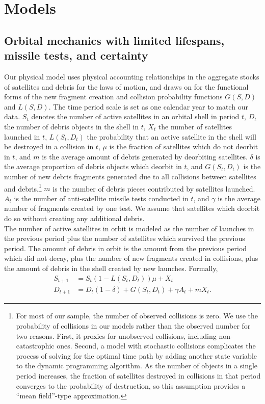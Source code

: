 \documentclass[12pt]{article}
\begin{document}
\section{Models}

\subsection{Orbital mechanics with limited lifespans, missile tests, and certainty}

Our physical model uses physical accounting relationships in the aggregate stocks of satellites and debris for the laws of motion, and draws on \citep{letiziaetal2017} for the functional forms of the new fragment creation and collision probability functions $G(S,D)$ and $L(S,D)$. The time period scale is set as one calendar year to match our data. $S_t$ denotes the number of active satellites in an orbital shell in period $t$, $D_t$ the number of debris objects in the shell in $t$, $X_t$ the number of satellites launched in $t$, $L(S_t,D_t)$ the probability that an active satellite in the shell will be destroyed in a collision in $t$, $\mu$ is the fraction of satellites which do not deorbit in $t$, and $m$ is the average amount of debris generated by deorbiting satellites. $\delta$ is the average proportion of debris objects which deorbit in $t$, and $G(S_t,D_t)$ is the number of new debris fragments generated due to all collisions between satellites and debris.\footnote{For most of our sample, the number of observed collisions is zero. We use the probability of collisions in our models rather than the observed number for two reasons. First, it proxies for unobserved collisions, including non-catastrophic ones. Second, a model with stochastic collisions complicates the process of solving for the optimal time path by adding another state variable to the dynamic programming algorithm. As the number of objects in a single period increases, the fraction of satellites destroyed in collisions in that period converges to the probability of destruction, so this assumption provides a ``mean field''-type approximation.} $m$ is the number of debris pieces contributed by satellites launched. $A_t$ is the number of anti-satellite missile tests conducted in $t$, and $\gamma$ is the average number of fragments created by one test. We assume that satellites which deorbit do so without creating any additional debris. \\

The number of active satellites in orbit is modeled as the number of launches in the previous period plus the number of satellites which survived the previous period. The amount of debris in orbit is the amount from the previous period which did not decay, plus the number of new fragments created in collisions, plus the amount of debris in the shell created by new launches. Formally,
\begin{align}
\label{satelliteLoM}
S_{t+1} &= S_t(1 - L(S_t,D_t))\mu + X_t \\
\label{debrisLoM}
D_{t+1} &= D_t(1-\delta) + G(S_t,D_t) + \gamma A_t + mX_t.
\end{align}
\end{document}
